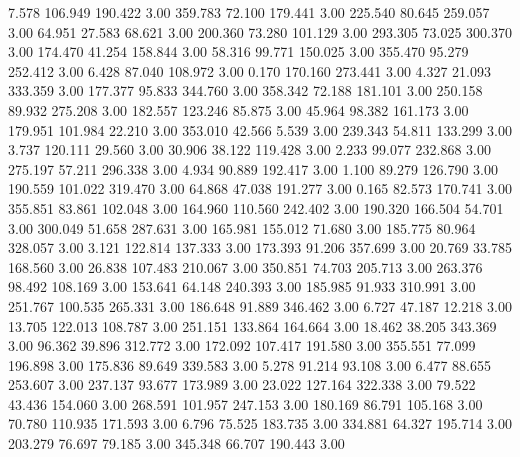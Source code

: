    7.578  106.949  190.422         3.00
 359.783   72.100  179.441         3.00
 225.540   80.645  259.057         3.00
  64.951   27.583   68.621         3.00
 200.360   73.280  101.129         3.00
 293.305   73.025  300.370         3.00
 174.470   41.254  158.844         3.00
  58.316   99.771  150.025         3.00
 355.470   95.279  252.412         3.00
   6.428   87.040  108.972         3.00
   0.170  170.160  273.441         3.00
   4.327   21.093  333.359         3.00
 177.377   95.833  344.760         3.00
 358.342   72.188  181.101         3.00
 250.158   89.932  275.208         3.00
 182.557  123.246   85.875         3.00
  45.964   98.382  161.173         3.00
 179.951  101.984   22.210         3.00
 353.010   42.566    5.539         3.00
 239.343   54.811  133.299         3.00
   3.737  120.111   29.560         3.00
  30.906   38.122  119.428         3.00
   2.233   99.077  232.868         3.00
 275.197   57.211  296.338         3.00
   4.934   90.889  192.417         3.00
   1.100   89.279  126.790         3.00
 190.559  101.022  319.470         3.00
  64.868   47.038  191.277         3.00
   0.165   82.573  170.741         3.00
 355.851   83.861  102.048         3.00
 164.960  110.560  242.402         3.00
 190.320  166.504   54.701         3.00
 300.049   51.658  287.631         3.00
 165.981  155.012   71.680         3.00
 185.775   80.964  328.057         3.00
   3.121  122.814  137.333         3.00
 173.393   91.206  357.699         3.00
  20.769   33.785  168.560         3.00
  26.838  107.483  210.067         3.00
 350.851   74.703  205.713         3.00
 263.376   98.492  108.169         3.00
 153.641   64.148  240.393         3.00
 185.985   91.933  310.991         3.00
 251.767  100.535  265.331         3.00
 186.648   91.889  346.462         3.00
   6.727   47.187   12.218         3.00
  13.705  122.013  108.787         3.00
 251.151  133.864  164.664         3.00
  18.462   38.205  343.369         3.00
  96.362   39.896  312.772         3.00
 172.092  107.417  191.580         3.00
 355.551   77.099  196.898         3.00
 175.836   89.649  339.583         3.00
   5.278   91.214   93.108         3.00
   6.477   88.655  253.607         3.00
 237.137   93.677  173.989         3.00
  23.022  127.164  322.338         3.00
  79.522   43.436  154.060         3.00
 268.591  101.957  247.153         3.00
 180.169   86.791  105.168         3.00
  70.780  110.935  171.593         3.00
   6.796   75.525  183.735         3.00
 334.881   64.327  195.714         3.00
 203.279   76.697   79.185         3.00
 345.348   66.707  190.443         3.00
